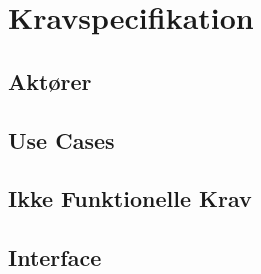 
\chapter{Kravspecifikation}


\section{Aktører}


\newpage
\section{Use Cases}



\newpage
\section{Ikke Funktionelle Krav}


\newpage
\section{Interface}


